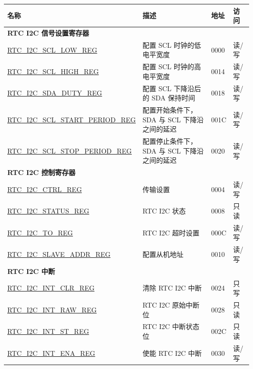 \begin{longtable}{ | p{6cm} | p{7.2cm} | p{1.3cm} | p{1cm} | }
\hline\rowcolor{lightgray}
名称 & 描述 &  地址 & 访问 \\ \hline
\endhead
\multicolumn{4}{|l|}{\textbf{ RTC I2C 信号设置寄存器}} \\ \hline
\hyperref[regdesc:RTCI2CSCLLOWREG]{RTC\_I2C\_SCL\_LOW\_REG} & 配置 SCL 时钟的低电平宽度 & \hexprefix{}0000 & 读/写 \\ \hline
\hyperref[regdesc:RTCI2CSCLHIGHREG]{RTC\_I2C\_SCL\_HIGH\_REG} & 配置 SCL 时钟的高电平宽度 & \hexprefix{}0014 & 读/写 \\ \hline
\hyperref[regdesc:RTCI2CSDADUTYREG]{RTC\_I2C\_SDA\_DUTY\_REG} & 配置 SCL 下降沿后的 SDA 保持时间 & \hexprefix{}0018 & 读/写 \\ \hline
\hyperref[regdesc:RTCI2CSCLSTARTPERIODREG]{RTC\_I2C\_SCL\_START\_PERIOD\_REG} & 配置开始条件下，SDA 与 SCL 下降沿之间的延迟 & \hexprefix{}001C & 读/写 \\ \hline
\hyperref[regdesc:RTCI2CSCLSTOPPERIODREG]{RTC\_I2C\_SCL\_STOP\_PERIOD\_REG} & 配置停止条件下，SDA 与 SCL 下降沿之间的延迟 & \hexprefix{}0020 & 读/写 \\ \hline
\multicolumn{4}{|l|}{\textbf{RTC I2C 控制寄存器}} \\ \hline
\hyperref[regdesc:RTCI2CCTRLREG]{RTC\_I2C\_CTRL\_REG} & 传输设置 & \hexprefix{}0004 & 读/写 \\ \hline
\hyperref[regdesc:RTCI2CSTATUSREG]{RTC\_I2C\_STATUS\_REG} & RTC I2C 状态& \hexprefix{}0008 & 只读 \\ \hline
\hyperref[regdesc:RTCI2CTOREG]{RTC\_I2C\_TO\_REG} & RTC I2C 超时设置& \hexprefix{}000C & 读/写 \\ \hline
\hyperref[regdesc:RTCI2CSLAVEADDRREG]{RTC\_I2C\_SLAVE\_ADDR\_REG} & 配置从机地址 & \hexprefix{}0010 & 读/写 \\ \hline
\multicolumn{4}{|l|}{\textbf{RTC I2C 中断}} \\ \hline
\hyperref[regdesc:RTCI2CINTCLRREG]{RTC\_I2C\_INT\_CLR\_REG} & 清除 RTC I2C 中断 & \hexprefix{}0024 & 只写 \\ \hline
\hyperref[regdesc:RTCI2CINTRAWREG]{RTC\_I2C\_INT\_RAW\_REG} & RTC I2C 原始中断位 & \hexprefix{}0028 & 只读 \\ \hline
\hyperref[regdesc:RTCI2CINTSTREG]{RTC\_I2C\_INT\_ST\_REG} & RTC I2C 中断状态位 & \hexprefix{}002C & 只读 \\ \hline
\hyperref[regdesc:RTCI2CINTENAREG]{RTC\_I2C\_INT\_ENA\_REG} & 使能 RTC I2C 中断 & \hexprefix{}0030 & 读/写 \\ \hline

\end{longtable}
